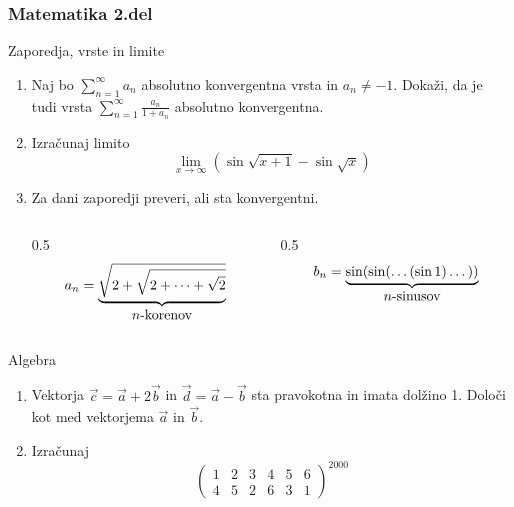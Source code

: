 \begin{frame}
	\frametitle{Matematika 2.del}
\end{frame}

\begin{frame}{Zaporedja, vrste in limite}
	\begin{enumerate}
		\item 
		Naj bo $\sum_{n=1}^\infty a_n $ absolutno konvergentna vrsta in $a_n \ne -1$.
		Dokaži, da je tudi vrsta $\sum_{n=1}^\infty \frac{a_n}{1+a_n}$
		absolutno konvergentna.

		\item
		Izračunaj limito
		\[
			\lim_{x \to \infty} (\sin{\sqrt{x+1}}-\sin{\sqrt{x}})
        \]
		\item
		Za dani zaporedji preveri, ali sta konvergentni.
		\begin{columns}
			\begin{column}{0.5\textwidth}
				\begin{equation*}
					a_n=\underbrace{\sqrt{2+\sqrt{2+\dots+\sqrt{2}}}}_{\text{\normalsize{$n$}-korenov}} 
				\end{equation*}
			\end{column}
			\begin{column}{0.5\textwidth}
				\begin{equation*}
					b_n = \underbrace{\sin(\sin(\dots(\sin 1)\dots))}_{\text{\normalsize{$n$}-sinusov}}
				\end{equation*}
			\end{column}
		\end{columns}
		
	\end{enumerate}
\end{frame}

\begin{frame}{Algebra}
	\begin{enumerate}
		\item
		Vektorja $\vec{c}=\vec{a}+2\vec{b}$ in $\vec{d}=\vec{a}-\vec{b}$
		sta pravokotna in imata dolžino 1. Določi kot med vektorjema $\vec{a}$ in $\vec{b}$.
		\item 
		Izračunaj
		\begin{equation*}
			\left(
				\begin{matrix}
					1 & 2 & 3 & 4 & 5 & 6 \\
					4 & 5 & 2 & 6 & 3 & 1 
				\end{matrix}
			\right)^{2000}
		\end{equation*}
		
	\end{enumerate}
\end{frame}

